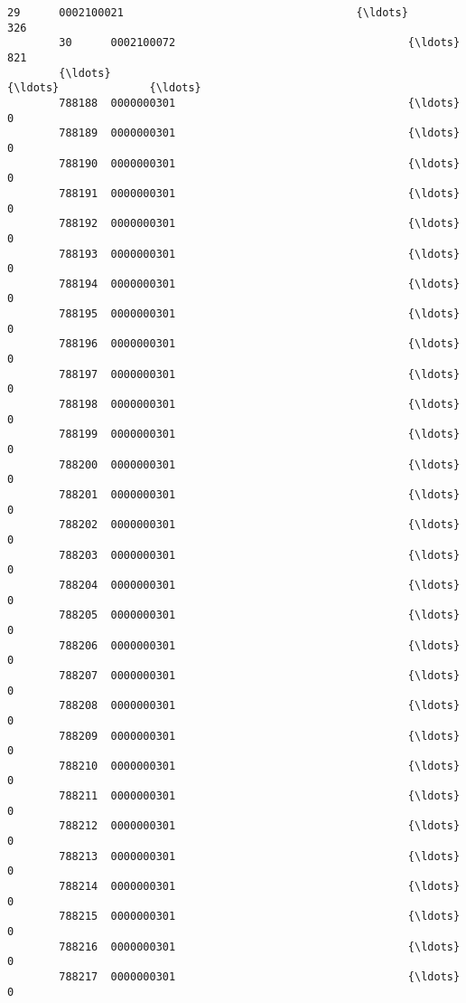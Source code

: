 \documentclass[11pt]{article}
\begin{document}
\begin{Verbatim}[commandchars=\\\{\}]
        29      0002100021                                    {\ldots}              326   
        30      0002100072                                    {\ldots}              821   
        {\ldots}                                                   {\ldots}              {\ldots}   
        788188  0000000301                                    {\ldots}                0   
        788189  0000000301                                    {\ldots}                0   
        788190  0000000301                                    {\ldots}                0   
        788191  0000000301                                    {\ldots}                0   
        788192  0000000301                                    {\ldots}                0   
        788193  0000000301                                    {\ldots}                0   
        788194  0000000301                                    {\ldots}                0   
        788195  0000000301                                    {\ldots}                0   
        788196  0000000301                                    {\ldots}                0   
        788197  0000000301                                    {\ldots}                0   
        788198  0000000301                                    {\ldots}                0   
        788199  0000000301                                    {\ldots}                0   
        788200  0000000301                                    {\ldots}                0   
        788201  0000000301                                    {\ldots}                0   
        788202  0000000301                                    {\ldots}                0   
        788203  0000000301                                    {\ldots}                0   
        788204  0000000301                                    {\ldots}                0   
        788205  0000000301                                    {\ldots}                0   
        788206  0000000301                                    {\ldots}                0   
        788207  0000000301                                    {\ldots}                0   
        788208  0000000301                                    {\ldots}                0   
        788209  0000000301                                    {\ldots}                0   
        788210  0000000301                                    {\ldots}                0   
        788211  0000000301                                    {\ldots}                0   
        788212  0000000301                                    {\ldots}                0   
        788213  0000000301                                    {\ldots}                0   
        788214  0000000301                                    {\ldots}                0   
        788215  0000000301                                    {\ldots}                0   
        788216  0000000301                                    {\ldots}                0   
        788217  0000000301                                    {\ldots}                0   
        

\end{Verbatim}
\end{document}
